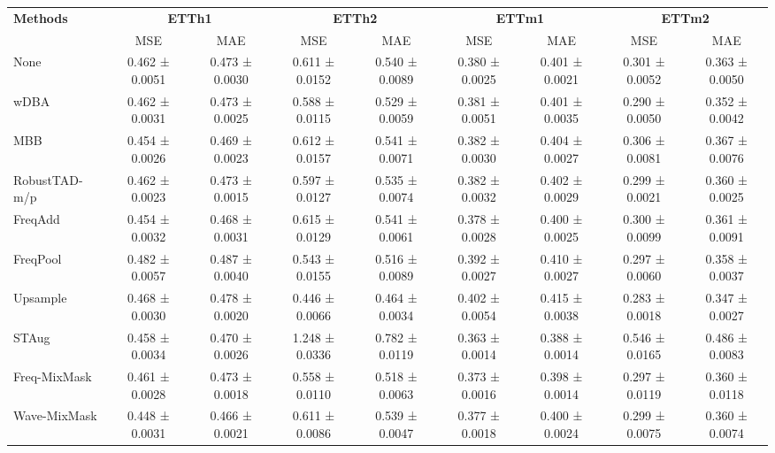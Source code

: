 \begin{table}[h!]
\centering
\vspace{0.2cm}
\renewcommand{\arraystretch}{1.3}
\begin{adjustbox}{max width=\textwidth}
\begin{tabular}{l|cc|cc|cc|cc}
    \toprule
    \textbf{Methods} & \multicolumn{2}{c|}{\textbf{ETTh1}} & \multicolumn{2}{c|}{\textbf{ETTh2}} & \multicolumn{2}{c|}{\textbf{ETTm1}} & \multicolumn{2}{c}{\textbf{ETTm2}} \\
    & MSE & MAE & MSE & MAE & MSE & MAE & MSE & MAE \\
    \midrule
    None          & 0.462 ± 0.0051 & 0.473 ± 0.0030 & 0.611 ± 0.0152 & 0.540 ± 0.0089 & 0.380 ± 0.0025 & 0.401 ± 0.0021 & 0.301 ± 0.0052 & 0.363 ± 0.0050 \\
    wDBA           & 0.462 ± 0.0031 & 0.473 ± 0.0025 & 0.588 ± 0.0115 & 0.529 ± 0.0059 & 0.381 ± 0.0051 & 0.401 ± 0.0035 & 0.290 ± 0.0050 & 0.352 ± 0.0042  \\
        MBB           & 0.454 ± 0.0026 & 0.469 ± 0.0023 & 0.612 ± 0.0157 & 0.541 ± 0.0071 & 0.382 ± 0.0030 & 0.404 ± 0.0027 & 0.306 ± 0.0081 & 0.367 ± 0.0076  \\
        RobustTAD-m/p   & 0.462 ± 0.0023 & 0.473 ± 0.0015 & 0.597 ± 0.0127 & 0.535 ± 0.0074 & 0.382 ± 0.0032 & 0.402 ± 0.0029 & 0.299 ± 0.0021 & 0.360 ± 0.0025 \\
        FreqAdd       & 0.454 ± 0.0032 & 0.468 ± 0.0031 & 0.615 ± 0.0129 & 0.541 ± 0.0061 & 0.378 ± 0.0028 & 0.400 ± 0.0025 & 0.300 ± 0.0099 & 0.361 ± 0.0091 \\
        FreqPool      & 0.482 ± 0.0057 & 0.487 ± 0.0040 & 0.543 ± 0.0155 & 0.516 ± 0.0089 & 0.392 ± 0.0027 & 0.410 ± 0.0027 & 0.297 ± 0.0060 & 0.358 ± 0.0037  \\
        Upsample      & 0.468 ± 0.0030 & 0.478 ± 0.0020 & \cellcolor{secondcolor}0.446 ± 0.0066 & \cellcolor{secondcolor}0.464 ± 0.0034 & 0.402 ± 0.0054 & 0.415 ± 0.0038 & \cellcolor{secondcolor}0.283 ± 0.0018 & \cellcolor{secondcolor}0.347 ± 0.0027  \\
        STAug         & 0.458 ± 0.0034 & 0.470 ± 0.0026 & 1.248 ± 0.0336 & 0.782 ± 0.0119 & \cellcolor{secondcolor}0.363 ± 0.0014 & \cellcolor{secondcolor}0.388 ± 0.0014 & 0.546 ± 0.0165 & 0.486 ± 0.0083  \\
        Freq-MixMask  & 0.461 ± 0.0028 & 0.473 ± 0.0018 & 0.558 ± 0.0110 & 0.518 ± 0.0063 & 0.373 ± 0.0016 & 0.398 ± 0.0014 & 0.297 ± 0.0119 & 0.360 ± 0.0118  \\
        Wave-MixMask  & \cellcolor{secondcolor}0.448 ± 0.0031 & 0.466 ± 0.0021 & 0.611 ± 0.0086 & 0.539 ± 0.0047 & 0.377 ± 0.0018 & 0.400 ± 0.0024 & 0.299 ± 0.0075 & 0.360 ± 0.0074  \\

\end{tabular}
\end{adjustbox}
\end{table}
